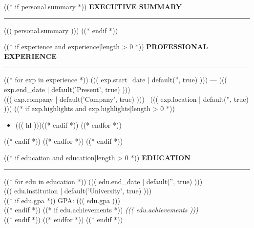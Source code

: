 \documentclass[11pt,a4paper]{article}
\newcommand{\sectionline}{\noindent\textcolor{divider}{\rule{\linewidth}{0.4pt}}\vspace{4pt}}
\begin{document}
\noindent
\hspace{20mm}
\begin{minipage}[t]{0.85\textwidth}

((* if personal.summary *))
{\fontsize{10}{12}\selectfont\bfseries\MakeUppercase{Executive Summary}}\\[2pt]
\sectionline
{\small ((( personal.summary )))}
\vspace{9pt}
((* endif *))

((* if experience and experience|length > 0 *))
{\fontsize{10}{12}\selectfont\bfseries\MakeUppercase{Professional Experience}}\\[2pt]
\sectionline
((* for exp in experience *))
 \hfill {\small\color{muted} ((( exp.start_date | default('', true) ))) --- ((( exp.end_date | default('Present', true) )))}\\
{\small\color{muted} ((( exp.company | default('Company', true) ))) \textbar\ ((( exp.location | default('', true) )))}
((* if exp.highlights and exp.highlights|length > 0 *))
\begin{itemize}[leftmargin=14pt, itemsep=2pt, parsep=0pt, topsep=4pt]
((* for hl in exp.highlights *))((* if hl *))\item {\small ((( hl )))}((* endif *))
((* endfor *))
\end{itemize}
((* endif *))
\vspace{8pt}
((* endfor *))
((* endif *))

((* if education and education|length > 0 *))
{\fontsize{10}{12}\selectfont\bfseries\MakeUppercase{Education}}\\[2pt]
\sectionline
((* for edu in education *))
 \hfill {\small\color{muted} ((( edu.end_date | default('', true) )))}\\
{\small\color{muted} ((( edu.institution | default('University', true) )))}\\
((* if edu.gpa *))
{\small GPA: ((( edu.gpa )))}\\
((* endif *))
((* if edu.achievements *))
{\small\textit{((( edu.achievements )))}}\\ 
((* endif *))
\vspace{8pt}
((* endfor *))
((* endif *))


\end{minipage}
\end{document}
